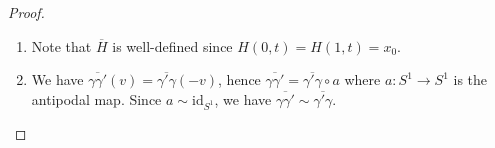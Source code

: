\begin{proof}
	\begin{enumerate}
		\item Note that \( \overline H \) is well-defined since \( H(0,t) = H(1,t) = x_0 \).
		\item We have \( \overline{\gamma\gamma'}(v) = \overline{\gamma'\gamma}(-v) \), hence \( \overline{\gamma\gamma'} = \overline{\gamma'\gamma} \circ a \) where \( a \colon S^1 \to S^1 \) is the antipodal map.
			Since \( a \sim \mathrm{id}_{S^1} \), we have \( \overline{\gamma\gamma'} \sim \overline{\gamma'\gamma} \).
	\end{enumerate}
\end{proof}
